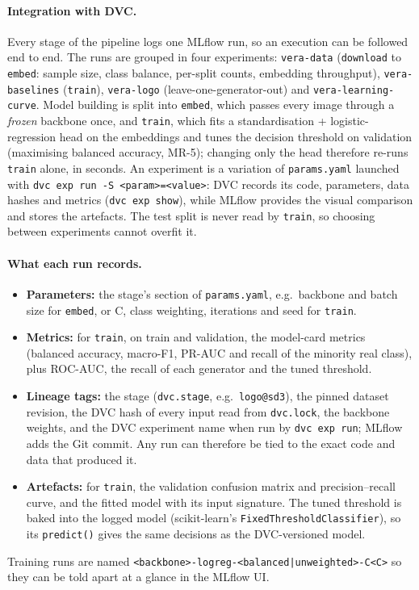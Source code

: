 \documentclass[11pt]{article}
\begin{document}
\paragraph{Integration with DVC.} Every stage of the pipeline logs one MLflow run, so an execution can be followed end to end. The runs are grouped in four experiments: \texttt{vera-data} (\texttt{download} to \texttt{embed}: sample size, class balance, per-split counts, embedding throughput), \texttt{vera-baselines} (\texttt{train}), \texttt{vera-logo} (leave-one-generator-out) and \texttt{vera-learning-curve}. Model building is split into \texttt{embed}, which passes every image through a \emph{frozen} backbone once, and \texttt{train}, which fits a standardisation + logistic-regression head on the embeddings and tunes the decision threshold on validation (maximising balanced accuracy, MR-5); changing only the head therefore re-runs \texttt{train} alone, in seconds. An experiment is a variation of \texttt{params.yaml} launched with \texttt{dvc exp run -S <param>=<value>}: DVC records its code, parameters, data hashes and metrics (\texttt{dvc exp show}), while MLflow provides the visual comparison and stores the artefacts. The test split is never read by \texttt{train}, so choosing between experiments cannot overfit it.

\paragraph{What each run records.}
\begin{itemize}[nosep,leftmargin=1.4em]
  \item \textbf{Parameters:} the stage's section of \texttt{params.yaml}, e.g.\ backbone and batch size for \texttt{embed}, or C, class weighting, iterations and seed for \texttt{train}.
  \item \textbf{Metrics:} for \texttt{train}, on train and validation, the model-card metrics (balanced accuracy, macro-F1, PR-AUC and recall of the minority real class), plus ROC-AUC, the recall of each generator and the tuned threshold.
  \item \textbf{Lineage tags:} the stage (\texttt{dvc.stage}, e.g.\ \texttt{logo@sd3}), the pinned dataset revision, the DVC hash of every input read from \texttt{dvc.lock}, the backbone weights, and the DVC experiment name when run by \texttt{dvc exp run}; MLflow adds the Git commit. Any run can therefore be tied to the exact code and data that produced it.
  \item \textbf{Artefacts:} for \texttt{train}, the validation confusion matrix and precision--recall curve, and the fitted model with its input signature. The tuned threshold is baked into the logged model (scikit-learn's \texttt{FixedThresholdClassifier}), so its \texttt{predict()} gives the same decisions as the DVC-versioned model.
\end{itemize}
Training runs are named \texttt{<backbone>-logreg-<balanced|unweighted>-C<C>} so they can be told apart at a glance in the MLflow UI.
\end{document}
